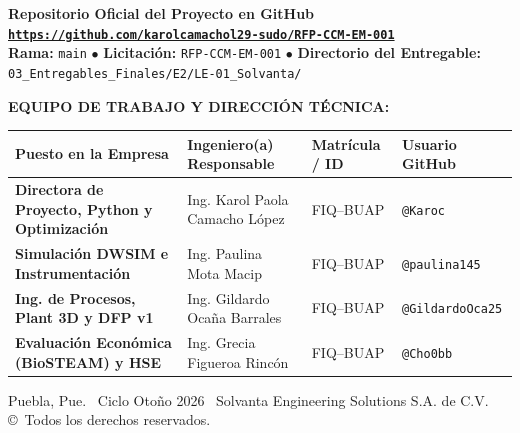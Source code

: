 \documentclass[10pt,letterpaper]{article}
\begin{document}
\begin{titlepage}
    \vspace{0.4cm}
    \begin{tcolorbox}[colframe=navyblue,colback=white,arc=2mm,boxrule=0.8pt]
        \centering
        \textbf{\color{navyblue}\large Repositorio Oficial del Proyecto en GitHub}\\[3pt]
        \href{https://github.com/karolcamachol29-sudo/RFP-CCM-EM-001}{\texttt{\textbf{https://github.com/karolcamachol29-sudo/RFP-CCM-EM-001}}}\\[4pt]
        \footnotesize
        \textbf{Rama:} \texttt{main} \quad $\bullet$ \quad
        \textbf{Licitación:} \texttt{RFP-CCM-EM-001} \quad $\bullet$ \quad
        \textbf{Directorio del Entregable:} \texttt{03\_Entregables\_Finales/E2/LE-01\_Solvanta/}
    \end{tcolorbox}

    \vspace{0.4cm}
    \textbf{\large EQUIPO DE TRABAJO Y DIRECCIÓN TÉCNICA:}\\[0.25cm]
    \begin{center}
    \footnotesize
    \setlength{\tabcolsep}{4pt}
    \begin{tabularx}{\textwidth}{>{\bfseries}p{4.3cm} X >{\centering\arraybackslash}p{2.4cm} >{\centering\arraybackslash}p{2.6cm}}
        \toprule
        \textbf{Puesto en la Empresa} & \textbf{Ingeniero(a) Responsable} & \textbf{Matrícula / ID} & \textbf{Usuario GitHub} \\
        \midrule
        Directora de Proyecto, Python y Optimización & Ing. Karol Paola Camacho López & FIQ--BUAP & \texttt{@Karoc} \\
        Simulación DWSIM e Instrumentación & Ing. Paulina Mota Macip & FIQ--BUAP & \texttt{@paulina145} \\
        Ing. de Procesos, Plant 3D y DFP v1 & Ing. Gildardo Ocaña Barrales & FIQ--BUAP & \texttt{@GildardoOca25} \\
        Evaluación Económica (BioSTEAM) y HSE & Ing. Grecia Figueroa Rincón & FIQ--BUAP & \texttt{@Cho0bb} \\
        \bottomrule
    \end{tabularx}
    \end{center}

    \vfill
    {\footnotesize Puebla, Pue. \textbar\ Ciclo Otoño 2026 \textbar\ Solvanta Engineering Solutions S.A. de C.V. \copyright\ Todos los derechos reservados.}
\end{titlepage}

\end{document}
